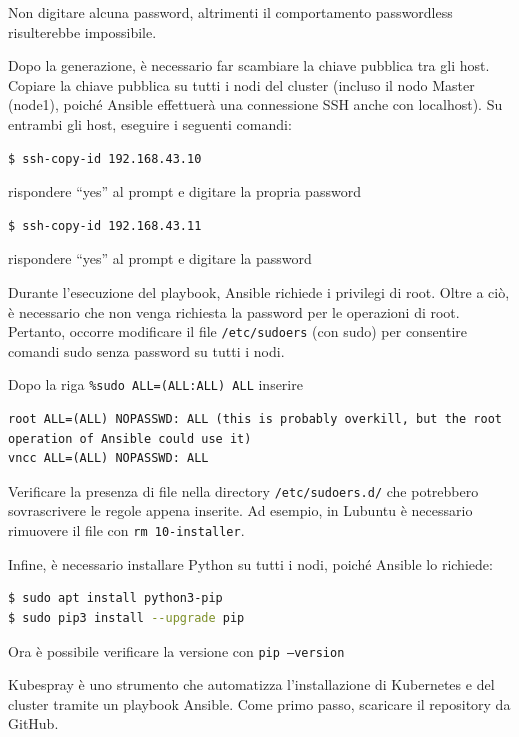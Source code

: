 \documentclass[11pt, a4paper]{article}
\begin{document}
Non digitare alcuna password, altrimenti il comportamento passwordless risulterebbe impossibile.


Dopo la generazione, è necessario far scambiare la chiave pubblica tra gli host. Copiare la chiave pubblica su tutti i nodi del cluster (incluso il nodo Master (node1), poiché Ansible effettuerà una connessione SSH anche con localhost). Su entrambi gli host, eseguire i seguenti comandi:

\begin{lstlisting}[language=bash]
$ ssh-copy-id 192.168.43.10
\end{lstlisting}
rispondere ``yes'' al prompt e digitare la propria password

\begin{lstlisting}[language=bash]
$ ssh-copy-id 192.168.43.11
\end{lstlisting}
rispondere ``yes'' al prompt e digitare la password

Durante l'esecuzione del playbook, Ansible richiede i privilegi di root. Oltre a ciò, è necessario che non venga richiesta la password per le operazioni di root. Pertanto, occorre modificare il file \texttt{/etc/sudoers} (con sudo) per consentire comandi sudo senza password su tutti i nodi.

Dopo la riga \texttt{\%sudo ALL=(ALL:ALL) ALL} inserire

\begin{lstlisting}
root ALL=(ALL) NOPASSWD: ALL (this is probably overkill, but the root operation of Ansible could use it)
vncc ALL=(ALL) NOPASSWD: ALL
\end{lstlisting}

Verificare la presenza di file nella directory \texttt{/etc/sudoers.d/} che potrebbero sovrascrivere le regole appena inserite. Ad esempio, in Lubuntu è necessario rimuovere il file con \texttt{rm 10-installer}.

Infine, è necessario installare Python su tutti i nodi, poiché Ansible lo richiede:

\begin{lstlisting}[language=bash]
$ sudo apt install python3-pip
$ sudo pip3 install --upgrade pip
\end{lstlisting}

Ora è possibile verificare la versione con \texttt{pip --version}

Kubespray è uno strumento che automatizza l'installazione di Kubernetes e del cluster tramite un playbook Ansible. Come primo passo, scaricare il repository da GitHub.
\end{document}

